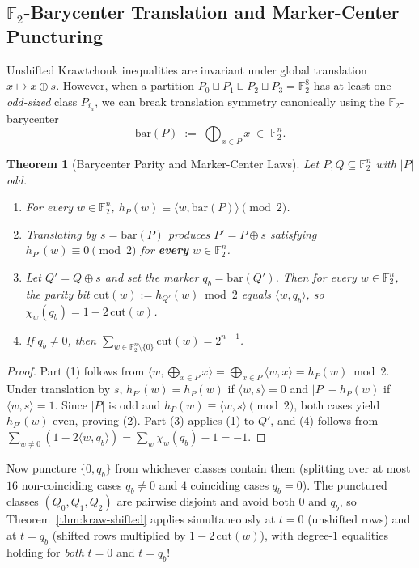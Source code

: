 \documentclass[11pt]{article}
\newtheorem{theorem}{Theorem}[section]
\theoremstyle{definition}
\newcommand{\F}{\mathbb{F}}
\begin{document}
\subsection{$\F_2$-Barycenter Translation and Marker-Center Puncturing}
\label{sec:barycenter}

Unshifted Krawtchouk inequalities are invariant under global translation $x \mapsto x \oplus s$.
However, when a partition $P_0 \sqcup P_1 \sqcup P_2 \sqcup P_3 = \F_2^8$ has at least one \emph{odd-sized} class $P_{i_a}$, we can break translation symmetry canonically using the $\F_2$-barycenter
\[
  \mathrm{bar}(P) \;:=\; \bigoplus_{x \in P} x \;\in\; \F_2^n.
\]

\begin{theorem}[Barycenter Parity and Marker-Center Laws]
\label{thm:barycenter}
Let $P, Q \subseteq \F_2^n$ with $|P|$ odd.
\begin{enumerate}[nosep]
  \item For every $w \in \F_2^n$, $h_P(w) \equiv \langle w, \mathrm{bar}(P) \rangle \pmod 2$.
  \item Translating by $s = \mathrm{bar}(P)$ produces $P' = P \oplus s$ satisfying $h_{P'}(w) \equiv 0 \pmod 2$ for \textbf{every} $w \in \F_2^n$.
  \item Let $Q' = Q \oplus s$ and set the marker $q_b = \mathrm{bar}(Q')$. Then for every $w \in \F_2^n$, the parity bit $\mathrm{cut}(w) := h_{Q'}(w) \bmod 2$ equals $\langle w, q_b \rangle$, so $\chi_w(q_b) = 1 - 2\,\mathrm{cut}(w)$.
  \item If $q_b \neq 0$, then $\sum_{w \in \F_2^n \setminus \{0\}} \mathrm{cut}(w) = 2^{n-1}$.
\end{enumerate}
\end{theorem}
\begin{proof}
Part (1) follows from $\langle w, \bigoplus_{x \in P} x \rangle = \bigoplus_{x \in P} \langle w, x \rangle = h_P(w) \bmod 2$.
Under translation by $s$, $h_{P'}(w) = h_P(w)$ if $\langle w, s \rangle = 0$ and $|P| - h_P(w)$ if $\langle w, s \rangle = 1$. Since $|P|$ is odd and $h_P(w) \equiv \langle w, s \rangle \pmod 2$, both cases yield $h_{P'}(w)$ even, proving (2).
Part (3) applies (1) to $Q'$, and (4) follows from $\sum_{w \neq 0} (1 - 2\langle w, q_b \rangle) = \sum_{w} \chi_w(q_b) - 1 = -1$.
\end{proof}

Now puncture $\{0, q_b\}$ from whichever classes contain them (splitting over at most $16$ non-coinciding cases $q_b \neq 0$ and $4$ coinciding cases $q_b = 0$). The punctured classes $(Q_0, Q_1, Q_2)$ are pairwise disjoint and avoid both $0$ and $q_b$, so Theorem~\ref{thm:kraw-shifted} applies simultaneously at $t = 0$ (unshifted rows) and at $t = q_b$ (shifted rows multiplied by $1 - 2\,\mathrm{cut}(w)$), with degree-$1$ equalities holding for \emph{both} $t = 0$ and $t = q_b$!
\end{document}
